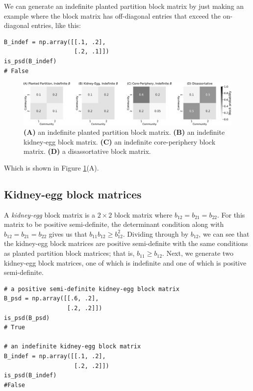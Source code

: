 We can generate an indefinite planted partition block matrix by just making an example where the block matrix has off-diagonal entries that exceed the on-diagonal entries, like this:


\begin{lstlisting}[style=python]
B_indef = np.array([[.1, .2], 
                    [.2, .1]])
is_psd(B_indef)
# False
\end{lstlisting}

\begin{figure}[h]
    \centering
    \includegraphics[width=\linewidth]{representations/ch5/Images/indef.png}
    \caption[Indefinite block matrices]{\textbf{(A)} an indefinite planted partition block matrix. \textbf{(B)} an indefinite kidney-egg block matrix. \textbf{(C)} an indefinite core-periphery block matrix. \textbf{(D)} a disassortative block matrix.}
    \label{fig:ch5:indef_bmtx}
\end{figure}

Which is shown in Figure \ref{fig:ch5:indef_bmtx}(A).

\subsection{Kidney-egg block matrices}

A \textit{kidney-egg} block matrix is a $2 \times 2$ block matrix where $b_{12} = b_{21} =  b_{22}$. For this matrix to be positive semi-definite, the determinant condition along with $b_{12} = b_{21} = b_{22}$ gives us that $b_{11}b_{12} \geq b_{12}^2$. Dividing through by $b_{12}$, we can see that the kidney-egg block matrices are positive semi-definite with the same conditions as planted partition block matrices; that is, $b_{11} \geq b_{12}$. Next, we generate two kidney-egg block matrices, one of which is indefinite and one of which is positive semi-definite. 

\begin{lstlisting}[style=python]
# a positive semi-definite kidney-egg block matrix
B_psd = np.array([[.6, .2], 
                  [.2, .2]])
is_psd(B_psd)
# True

# an indefinite kidney-egg block matrix
B_indef = np.array([[.1, .2], 
                    [.2, .2]])
is_psd(B_indef)
#False
\end{lstlisting}


